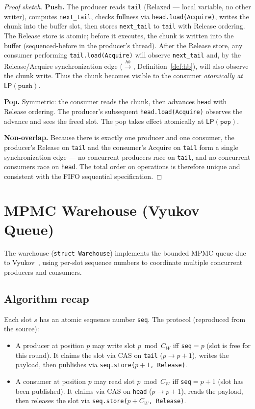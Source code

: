 \documentclass[11pt,a4paper]{article}
\newcommand{\LP}[1]{\mathsf{LP}(#1)}
\newcommand{\code}[1]{\texttt{#1}}
\begin{document}
\begin{proof}[Proof sketch]
\textbf{Push.}  The producer reads \code{tail} (Relaxed --- local
variable, no other writer), computes \code{next\_tail}, checks
fullness via \code{head.load(Acquire)}, writes the chunk into the
buffer slot, then stores \code{next\_tail} to \code{tail} with
Release ordering.  The Release store is atomic; before it executes,
the chunk is written into the buffer (sequenced-before in the
producer's thread).  After the Release store, any consumer
performing \code{tail.load(Acquire)} will observe \code{next\_tail}
and, by the Release/Acquire synchronization edge
($\xrightarrow{hb}$, Definition~\ref{def:hb}), will also observe
the chunk write.  Thus the chunk becomes visible to the consumer
\emph{atomically at} $\LP{\code{push}}$.

\textbf{Pop.}  Symmetric: the consumer reads the chunk, then
advances \code{head} with Release ordering.  The producer's
subsequent \code{head.load(Acquire)} observes the advance and sees
the freed slot.  The pop takes effect atomically at
$\LP{\code{pop}}$.

\textbf{Non-overlap.}  Because there is exactly one producer and
one consumer, the producer's Release on \code{tail} and the
consumer's Acquire on \code{tail} form a single synchronization
edge --- no concurrent producers race on \code{tail}, and no
concurrent consumers race on \code{head}.  The total order on
operations is therefore unique and consistent with the
FIFO sequential specification.
\end{proof}

\section{MPMC Warehouse (Vyukov Queue)}
\label{sec:mpmc}

The warehouse (\code{struct Warehouse}) implements the bounded MPMC
queue due to Vyukov~\cite{vyukov2010}, using per-slot sequence
numbers to coordinate multiple concurrent producers and consumers.

\subsection{Algorithm recap}

Each slot $s$ has an atomic sequence number \code{seq}.
The protocol (reproduced from the source):
\begin{itemize}
  \item A producer at position $p$ may write slot $p \bmod C_W$
        iff \code{seq}$= p$ (slot is free for this round).
        It claims the slot via CAS on \code{tail} ($p \to p+1$),
        writes the payload, then publishes via
        \code{seq.store($p+1$, Release)}.
  \item A consumer at position $p$ may read slot $p \bmod C_W$
        iff \code{seq}$= p+1$ (slot has been published).
        It claims via CAS on \code{head} ($p \to p+1$),
        reads the payload, then releases the slot via
        \code{seq.store($p + C_W$, Release)}.
\end{itemize}
\end{document}
